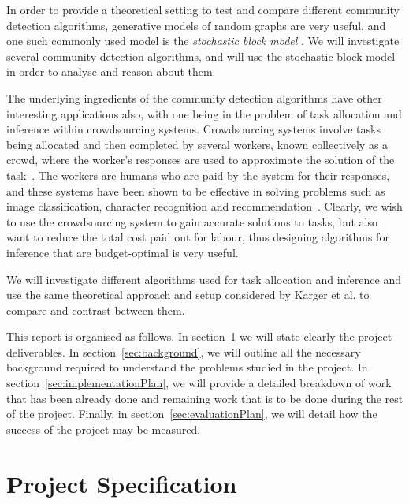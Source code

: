 \documentclass[12pt]{article}
\numberwithin{equation}{section}
\begin{document}
In order to provide a theoretical setting to test and compare different community detection algorithms, generative models of random graphs are very useful, and one such commonly used model is the \textit{stochastic block model} \cite{DKM+13}. We will investigate several community detection algorithms, and will use the stochastic block model in order to analyse and reason about them.

The underlying ingredients of the community detection algorithms have other interesting applications also, with one being in the problem of task allocation and inference within crowdsourcing systems. Crowdsourcing systems involve tasks being allocated and then completed by several workers, known collectively as a crowd, where the worker's responses are used to approximate the solution of the task~\cite{KOS13,EHR12}. The workers are humans who are paid by the system for their responses, and these systems have been shown to be effective in solving problems such as image classification, character recognition and recommendation~\cite{KOS13}. Clearly, we wish to use the crowdsourcing system to gain accurate solutions to tasks, but also want to reduce the total cost paid out for labour, thus designing algorithms for inference that are budget-optimal is very useful.

We will investigate different algorithms used for task allocation and inference and use the same theoretical approach and setup considered by Karger et al. \cite{KOS13} to compare and contrast between them.

This report is organised as follows. In section~\ref{sec:projectSpecification} we will state clearly the project deliverables. In section~\ref{sec:background}, we will outline all the necessary background required to understand the problems studied in the project. In section~\ref{sec:implementationPlan}, we will provide a detailed breakdown of work that has been already done and remaining work that is to be done during the rest of the project. Finally, in section~\ref{sec:evaluationPlan}, we will detail how the success of the project may be measured.


\newpage
\thispagestyle{plain}
\mbox{}
\section {Project Specification}
\label{sec:projectSpecification}
\end{document}

